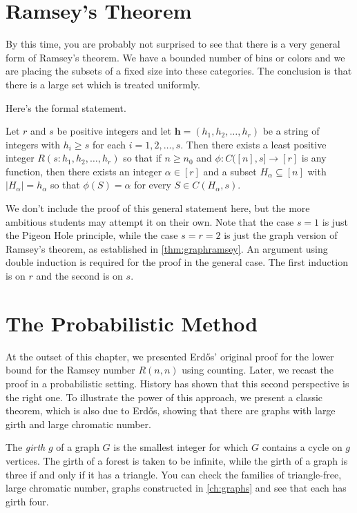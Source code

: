 \section{Ramsey's Theorem}\label{s:ramsey:theorem}

By this time, you are probably not surprised to see that there
is a very general form of Ramsey's theorem.  We have a bounded
number of bins or colors and we are placing the subsets of a
fixed size into these categories.  The conclusion is that there
is a large set which is treated uniformly.

Here's the formal statement.

\begin{theorem}\label{thm:genramsey}
Let $r$ and $s$ be positive integers and
let $\mathbf{h}=(h_1,h_2,\dots,h_r)$ be a string
of integers with $h_i\ge s$ for each $i=1,2,\dots,s$. 
Then there exists a least positive integer $R(s:h_1,h_2,\dots,h_r)$
so that if $n\ge n_0$ and $\phi:C([n],s]\longrightarrow [r]$
is any function, then there exists an integer $\alpha\in[r]$
and a subset $H_\alpha\subseteq [n]$ with $|H_\alpha|=h_\alpha$
so that $\phi(S)=\alpha$ for every $S\in C(H_\alpha, s)$.
\end{theorem}
We don't include the proof of this general statement here, but
the more ambitious students may attempt it on their own.  Note
that the case $s=1$ is just the Pigeon Hole principle, while the
case $s=r=2$ is just the graph version of Ramsey's theorem,
as established in \autoref{thm:graphramsey}.  An argument
using double induction is required for the proof in the general
case.  The first induction is on $r$ and the second is on $s$.

\section{The Probabilistic Method}\label{s:ramsey:girth}

At the outset of this chapter, we presented Erd\H{o}s' original proof
for the lower bound for the Ramsey number $R(n,n)$ using counting.
Later, we recast the proof in a probabilistic setting.  History has
shown that this second perspective is the right one. To illustrate 
the power of this approach, we present a classic 
theorem, which is also due to Erd\H{o}s, showing that there
are graphs with large girth and large chromatic number.
 
The \textit{girth} $g$ of a graph $G$ is the smallest integer for
which $G$ contains a cycle on $g$ vertices.  The girth of a forest is
taken to be infinite, while the girth of a graph is three if and only
if it has a triangle.  You can check the families of triangle-free,
large chromatic number, graphs constructed in \autoref{ch:graphs} and
see that each has girth four.

